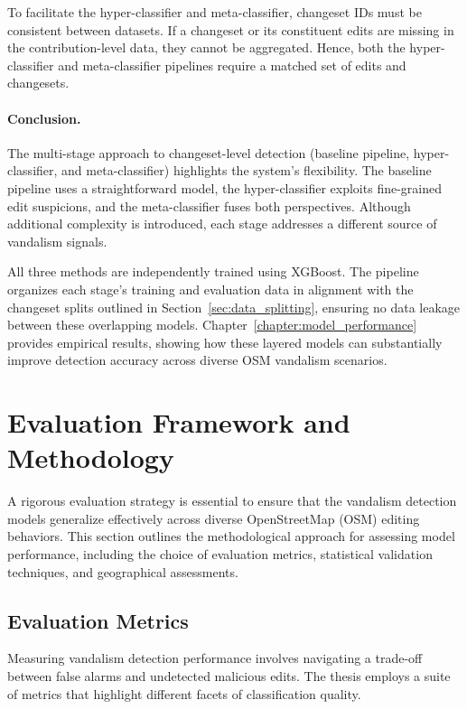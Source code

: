 \documentclass[
    13pt, %
    a4paper, %
    listof=totoc, %
    bibliography=totoc, %
    index=totoc, %
    headsepline
]{scrreprt}
\begin{document}
To facilitate the hyper-classifier and meta-classifier, changeset IDs must be consistent between datasets. If a changeset or its constituent edits are missing in the contribution-level data, they cannot be aggregated. Hence, both the hyper-classifier and meta-classifier pipelines require a matched set of edits and changesets.

\paragraph{Conclusion.}

The multi-stage approach to changeset-level detection (baseline pipeline, hyper-classifier, and meta-classifier) highlights the system’s flexibility. The baseline pipeline uses a straightforward model, the hyper-classifier exploits fine-grained edit suspicions, and the meta-classifier fuses both perspectives. Although additional complexity is introduced, each stage addresses a different source of vandalism signals.

All three methods are independently trained using XGBoost. The pipeline organizes each stage’s training and evaluation data in alignment with the changeset splits outlined in Section~\ref{sec:data_splitting}, ensuring no data leakage between these overlapping models. Chapter~\ref{chapter:model_performance} provides empirical results, showing how these layered models can substantially improve detection accuracy across diverse OSM vandalism scenarios.

\section{Evaluation Framework and Methodology}
\label{sec:evaluation_framework}

A rigorous evaluation strategy is essential to ensure that the vandalism detection models generalize effectively across diverse OpenStreetMap (OSM) editing behaviors. This section outlines the methodological approach for assessing model performance, including the choice of evaluation metrics, statistical validation techniques, and geographical assessments.

\subsection{Evaluation Metrics}
\label{sec:evaluation_metrics}

Measuring vandalism detection performance involves navigating a trade-off between false alarms and undetected malicious edits. The thesis employs a suite of metrics that highlight different facets of classification quality.
\end{document}
